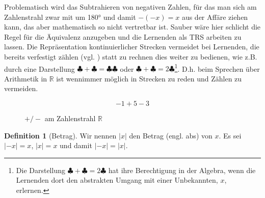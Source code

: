 \documentclass[a4paper]{book}%
\theoremstyle{definition}
\newtheorem{definition}{Definition}
\begin{document}
Problematisch wird das Subtrahieren von negativen Zahlen, für das man sich am Zahlenstrahl zwar mit  um 180° und damit $-(-x) = x$ aus der Affäre ziehen kann, das aber mathematisch so nicht vertretbar ist. Sauber wäre hier schlicht die Regel für die Äquivalenz anzugeben und die Lernenden als \gls{TRS} arbeiten zu lassen. Die Repräsentation kontinuierlicher Strecken vermeidet bei Lernenden, die bereits verfestigt zählen (vgl. \citep[S. 112]{Hasemann2014}) statt zu rechnen dies weiter zu bedienen, wie z.B. durch eine Darstellung $\clubsuit + \clubsuit = \clubsuit \clubsuit$ oder $\clubsuit + \clubsuit = 2 \clubsuit$\footnote{Die Darstellung $\clubsuit + \clubsuit = 2 \clubsuit$ hat ihre Berechtigung in der Algebra, wenn die Lernenden dort den abstrakten Umgang mit einer Unbekannten, $x$, erlernen.}. D.h. beim Sprechen über Arithmetik in $\mathbb{R}$ ist wennimmer möglich in Strecken zu reden und Zählen zu vermeiden.

\begin{equation}
    -1 + 5 - 3
\end{equation}

\begin{figure}[H]
  \centering
{}
  \caption{$+/-$ am Zahlenstrahl $\mathbb{R}$}\label{fig:zahlenstrahlSubtraktion}
\end{figure}

\begin{definition}[Betrag]
    Wir nennen $|x|$ den Betrag (engl. abs) von $x$. Es sei $|-x| = x$, $|x|=x$ und damit $|-x|=|x|$.
\end{definition}
\end{document}
